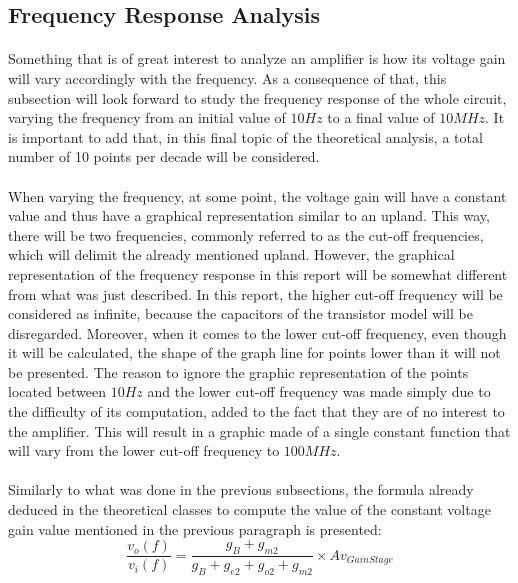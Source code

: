 

\subsection{Frequency Response Analysis}

\paragraph{}Something that is of great interest to analyze an amplifier is how its voltage gain will vary accordingly with the frequency. As a consequence of that, this subsection will look forward to study the frequency response of the whole circuit, varying the frequency from an initial value of $10 Hz$ to a final value of $10 MHz$. It is important to add that, in this final topic of the theoretical analysis, a total number of 10 points per decade will be considered.
\paragraph{}When varying the frequency, at some point, the voltage gain will have a constant value and thus have a graphical representation similar to an upland. This way, there will be two frequencies, commonly referred to as the cut-off frequencies, which will delimit the already mentioned upland. However, the graphical representation of the frequency response in this report will be somewhat different from what was just described. In this report, the higher cut-off frequency will be considered as infinite, because the capacitors of the transistor model will be disregarded. Moreover, when it comes to the lower cut-off frequency, even though it will be calculated, the shape of the graph line for points lower than it will not be presented. The reason to ignore the graphic representation of the points located between $10Hz$ and the lower cut-off frequency was made simply due to the difficulty of its computation, added to the fact that they are of no interest to the amplifier. This will result in a graphic made of a single constant function that will vary from the lower cut-off frequency to $100MHz$.  
\paragraph{}Similarly to what was done in the previous subsections, the formula already deduced in the theoretical classes to compute the value of the constant voltage gain value mentioned in the previous paragraph is presented:
\begin{equation}	
    \frac{v_o(f)}{v_i(f)}=\frac{g_B+g_{m2}}{g_B+g_{e2}+g_{o2}+g_{m2}}\times Av_{Gain Stage} 	
\end{equation}
